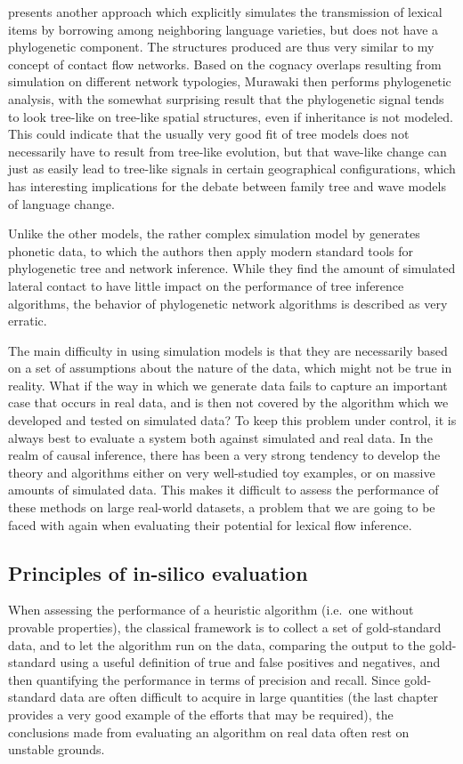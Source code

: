 \cite{murawaki2015} presents another approach which explicitly simulates the transmission of lexical items by borrowing among neighboring language varieties, but does not have a phylogenetic component. The structures produced are thus very similar to my concept of contact flow networks. Based on the cognacy overlaps resulting from simulation on different network typologies, Murawaki then performs phylogenetic analysis, with the somewhat surprising result that the phylogenetic signal tends to look tree-like on tree-like spatial structures, even if inheritance is not modeled. This could indicate that the usually very good fit of tree models does not necessarily have to result from tree-like evolution, but that wave-like change can just as easily lead to tree-like signals in certain geographical configurations, which has interesting implications for the debate between family tree and wave models of language change.

Unlike the other models, the rather complex simulation model by \cite{hochmuth_ea_2008} generates phonetic data, to which the authors then apply modern standard tools for phylogenetic tree and network inference. While they find the amount of simulated lateral contact to have little impact on the performance of tree inference algorithms, the behavior of phylogenetic network algorithms is described as very erratic.

The main difficulty in using simulation models is that they are necessarily based on a set of assumptions about the nature of the data, which might not be true in reality. What if the way in which we generate data fails to capture an important case that occurs in real data, and is then not covered by the algorithm which we developed and tested on simulated data? To keep this problem under control, it is always best to evaluate a system both against simulated and real data. In the realm of causal inference, there has been a very strong tendency to develop the theory and algorithms either on very well-studied toy examples, or on massive amounts of simulated data. This makes it difficult to assess the performance of these methods on large real-world datasets, a problem that we are going to be faced with again when evaluating their potential for lexical flow inference.

\subsection{Principles of in-silico evaluation}
When assessing the performance of a heuristic algorithm (i.e.\ one without provable properties), the classical framework is to collect a set of gold-standard data, and to let the algorithm run on the data, comparing the output to the gold-standard using a useful definition of true and false positives and negatives, and then quantifying the performance in terms of precision and recall. Since gold-standard data are often difficult to acquire in large quantities (the last chapter provides a very good example of the efforts that may be required), the conclusions made from evaluating an algorithm on real data often rest on unstable grounds.

